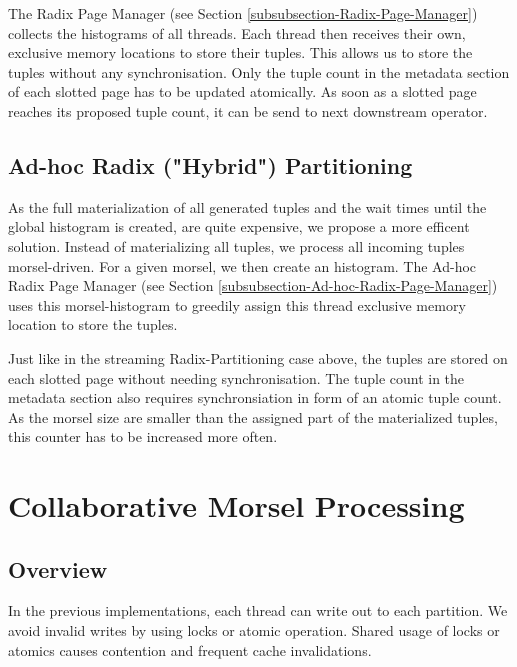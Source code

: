 The Radix Page Manager (see Section \ref{subsubsection-Radix-Page-Manager}) collects the histograms of all threads.
Each thread then receives their own, exclusive memory locations to store their tuples.
This allows us to store the tuples without any synchronisation.
Only the tuple count in the metadata section of each slotted page has to be updated atomically.
As soon as a slotted page reaches its proposed tuple count, it can be send to next downstream operator.

\subsection{Ad-hoc Radix ("Hybrid") Partitioning}
As the full materialization of all generated tuples and the wait times until the global histogram is created, are quite expensive, we propose a more efficent solution.
Instead of materializing all tuples, we process all incoming tuples morsel-driven.
For a given morsel, we then create an histogram.
The Ad-hoc Radix Page Manager (see Section \ref{subsubsection-Ad-hoc-Radix-Page-Manager}) uses this morsel-histogram to greedily assign this thread exclusive memory location to store the tuples.

Just like in the streaming Radix-Partitioning case above, the tuples are stored on each slotted page without needing synchronisation.
The tuple count in the metadata section also requires synchronsiation in form of an atomic tuple count.
As the morsel size are smaller than the assigned part of the materialized tuples, this counter has to be increased more often.

\section{Collaborative Morsel Processing}\label{section-Collaborative-Morsel-Processing}
\subsection{Overview}
In the previous implementations, each thread can write out to each partition.
We avoid invalid writes by using locks or atomic operation.
Shared usage of locks or atomics causes contention and frequent cache invalidations.

